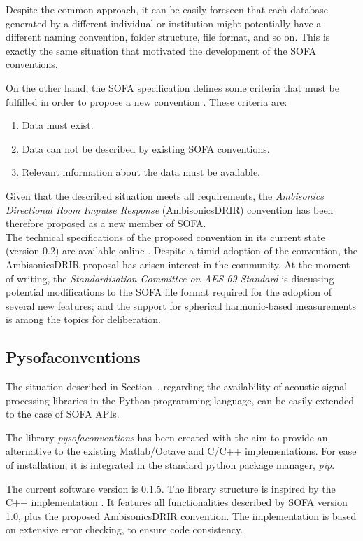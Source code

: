 Despite the common approach, it can be easily foreseen that each database generated by a different individual or institution might potentially have a different naming convention, folder structure, file format, and so on. 
This is exactly the same situation that motivated the development of the SOFA conventions. 

On the other hand, the SOFA specification defines some criteria that must be fulfilled in order to propose a new convention \cite{sofaconventions}. These criteria are:
\begin{enumerate}
    \item Data must exist.
    \item Data can not be described by existing SOFA conventions.
    \item Relevant information about the data must be available.
\end{enumerate} 

Given that the described situation meets all requirements, the \textit{Ambisonics Directional Room Impulse Response} (AmbisonicsDRIR) convention has been therefore proposed as a new member of SOFA.\\

The technical specifications of the proposed convention in its current state (version 0.2) are available online \cite{ambisonicsdrir}. 
Despite a timid adoption of the convention, the AmbisonicsDRIR proposal has arisen interest in the community. At the moment of writing, the \textit{Standardisation Committee on AES-69 Standard} is discussing potential modifications to the SOFA file format required for the adoption of several new features; and the support for spherical harmonic-based measurements is among the topics for deliberation.


\subsection{Pysofaconventions}

The situation described in Section~\label{sec:intro_data}, regarding the availability of acoustic signal processing libraries in the Python programming language, can be easily extended to the case of SOFA APIs.
 
The library \textit{pysofaconventions} has been created with the aim to provide an alternative to the existing Matlab/Octave and C/C++ implementations. 
For ease of installation, it is integrated in the standard python package manager, \textit{pip}. 

The current software version is 0.1.5. The library structure is inspired by the C++ implementation \cite{api_cpp}. 
It features all functionalities described by SOFA version 1.0, plus the proposed AmbisonicsDRIR convention. 
The implementation is based on extensive error checking, to ensure code consistency.
 
